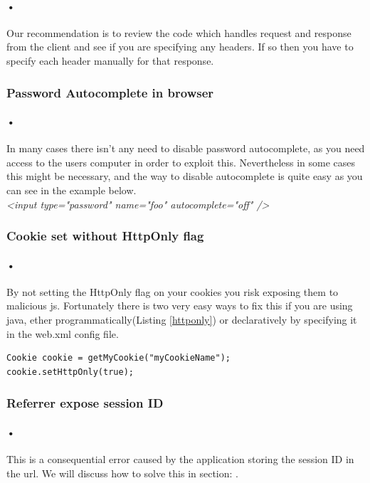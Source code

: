 \documentclass[11pt,english,a4paper]{report}
\begin{document}
\paragraph{•}
Our recommendation is to review the code which handles request and response from the client and see if you are specifying any headers.
If so then you have to specify each header manually for that response.\cite{spring-security}

\subsubsection{Password Autocomplete in browser}
\paragraph{•}
In many cases there isn't any need to disable password autocomplete, as you need access to the users computer in order to exploit this.
Nevertheless in some cases this might be necessary, and the way to disable autocomplete is quite easy as you can see in the example below.
\\
\textit{ \textless input type="password" name="foo" autocomplete="off" /\textgreater}

\subsubsection{Cookie set without HttpOnly flag}
\paragraph{•}
By not setting the HttpOnly flag on your cookies you risk exposing them to malicious \gls{js}.
Fortunately there is two very easy ways to fix this if you are using \gls{java}, ether programmatically(Listing \ref{httponly}) or declaratively by specifying it in the web.xml config file.\cite{httponly}
\\
\begin{lstlisting}[caption=Setting the HttpOnly Flag in Java,label=httponly]
Cookie cookie = getMyCookie("myCookieName");
cookie.setHttpOnly(true);
\end{lstlisting}


\subsubsection{Referrer expose session ID}
\paragraph{•}
This is a consequential error caused by the application storing the session ID in the \gls{url}.
We will discuss how to solve this in section: .
\end{document}
